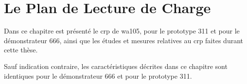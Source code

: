 \chapter{Le Plan de Lecture de Charge}
    
    Dans ce chapitre est présenté le \gls{crp} de \gls{wa105}, pour le prototype 311 et pour le démonstrateur 666, ainsi que les études et mesures relatives au \gls{crp} faites durant cette thèse.
    
    Sauf indication contraire, les caractéristiques décrites dans ce chapitre sont identiques pour le démonstrateur 666 et pour le prototype 311.
    
